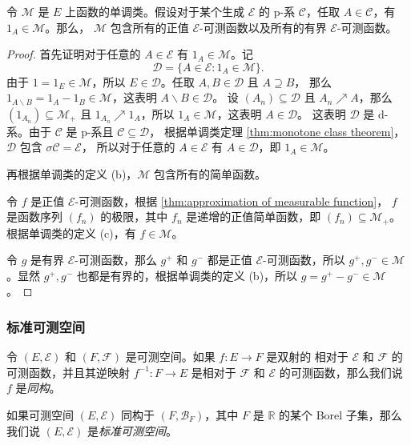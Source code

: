 \documentclass[fontset=none]{Notes}
\begin{document}
\begin{theorem}
  令 $\mathcal{M}$ 是 $E$ 上函数的单调类。假设对于某个生成 $\mathcal{E}$
  的 p-系 $\mathcal{C}$，任取 $A\in \mathcal{C}$，有 $1_A\in \mathcal{M}$。那么，
  $\mathcal{M}$ 包含所有的正值 $\mathcal{E}$-可测函数以及所有的有界 $\mathcal{E}$-可测函数。
\end{theorem} 
\begin{proof}
  首先证明对于任意的 $A\in \mathcal{E}$ 有 $1_A\in \mathcal{M}$。记
  \[
    \mathcal{D}=\{A\in \mathcal{E}:1_A\in \mathcal{M}\}.
  \]
  由于 $1=1_E\in \mathcal{M}$，所以 $E\in \mathcal{D}$。任取 $A,B\in \mathcal{D}$ 且 $A\supseteq B$，
  那么 $1_{A \smallsetminus B}=1_A-1_B\in \mathcal{M}$，这表明 $A \smallsetminus B\in \mathcal{D}$。
  设 $(A_n)\subseteq \mathcal{D}$ 且 $A_n\nearrow A$，那么 $(1_{A_n})\subseteq \mathcal{M}_+$
  且 $1_{A_n}\nearrow 1_A$，所以 $1_A\in \mathcal{M}$，这表明 $A\in \mathcal{D}$。
  这表明 $\mathcal{D}$ 是 d-系。由于 $\mathcal{C}$ 是 p-系且 $\mathcal{C}\subseteq \mathcal{D}$，
  根据单调类定理 \ref{thm:monotone class theorem}，$\mathcal{D}$ 包含 $\sigma \mathcal{C}=\mathcal{E}$，
  所以对于任意的 $A\in \mathcal{E}$ 有 $A\in \mathcal{D}$，即 $1_A\in \mathcal{M}$。

  再根据单调类的定义 (b)，$\mathcal{M}$ 包含所有的简单函数。

  令 $f$ 是正值 $\mathcal{E}$-可测函数，根据 \autoref{thm:approximation of measurable function}，
  $f$ 是函数序列 $(f_n)$ 的极限，其中 $f_n$ 是递增的正值简单函数，即 $(f_n)\subseteq \mathcal{M}_+$。
  根据单调类的定义 (c)，有 $f\in \mathcal{M}$。

  令 $g$ 是有界 $\mathcal{E}$-可测函数，那么 $g^+$ 和 $g^-$ 都是正值 $\mathcal{E}$-可测函数，所以
  $g^+,g^-\in \mathcal{M}$。显然 $g^+,g^-$ 也都是有界的，根据单调类的定义 (b)，所以
  $g=g^+-g^-\in \mathcal{M}$。
\end{proof}

\subsubsection{标准可测空间}

令 $(E,\mathcal{E})$ 和 $(F,\mathcal{F})$ 是可测空间。如果 $f:E\to F$ 是双射的
相对于 $\mathcal{E}$ 和 $\mathcal{F}$ 的可测函数，并且其逆映射 $f^{-1}:F\to E$
是相对于 $\mathcal{F}$ 和 $\mathcal{E}$ 的可测函数，那么我们说 $f$ 是\emph{同构}。

如果可测空间 $(E,\mathcal{E})$ 同构于 $(F,\mathcal{B}_F)$，其中 $F$ 是 $\mathbb{R}$
的某个 Borel 子集，那么我们说 $(E,\mathcal{E})$ 是\emph{标准可测空间}。
\end{document}
